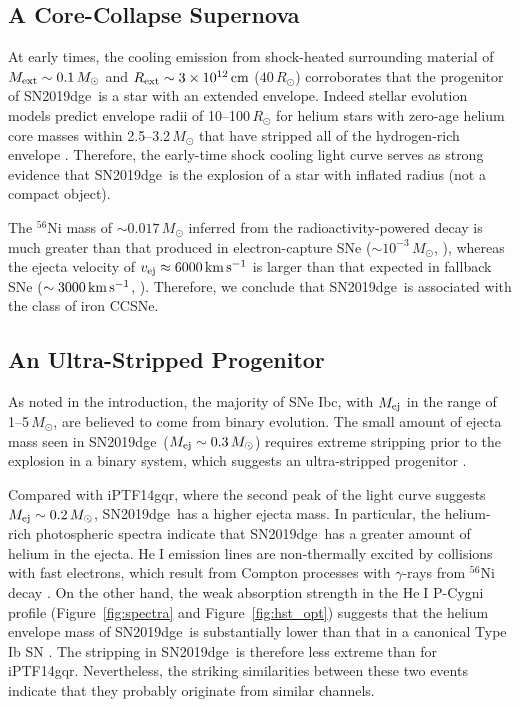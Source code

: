 \documentclass[twocolumn]{aastex63}
\newcommand{\name}{SN2019dge}
\def\ion#1#2{#1$\;${\footnotesize\rm{#2}}\relax}
\begin{document}
\begin{CJK*}{UTF8}{gbsn}
\subsection{A Core-Collapse Supernova}
At early times, the cooling emission from shock-heated surrounding material of $M_{\rm 
ext}\sim0.1\,M_\odot$ and $R_{\rm ext}\sim 3\times 10^{12}\,{\rm cm}$ ($40\,{ R_\odot}$) corroborates 
that the progenitor of \name\ is a star with an extended envelope. Indeed stellar evolution models 
predict envelope radii of 10--100\,$R_\odot$ for helium stars with zero-age helium core masses within 
2.5--3.2\,$M_\odot$ that have stripped all of the hydrogen-rich envelope \citep{Woosley2019, 
Laplace2020}. Therefore, the early-time shock cooling 
light curve serves as strong evidence that \name\ is the explosion of a star with inflated radius (not a 
compact object).

The $^{56}$Ni mass of $\sim 0.017\,M_\odot$ inferred from the radioactivity-powered decay 
is much greater than that produced in electron-capture SNe ($\sim10^{-3}\,M_\odot$, 
\citealt{Moriya2014}), whereas the ejecta velocity of $v_{\rm ej}\approx6000\,{\rm km\, s^{-1}}$ is 
larger than that expected in fallback SNe ($\sim3000\,{\rm km\,s^{-1}}$, \citealt{Moriya2010}). 
Therefore, we conclude that \name\ is associated with the class of iron CCSNe.

\subsection{An Ultra-Stripped Progenitor}
As noted in the introduction, the majority of SNe Ibc, with $M_{\rm ej}$ in the range of 
1--5\,$M_\odot$, are believed to come from binary evolution. The small amount of ejecta mass seen in 
\name\ ($M_{\rm ej}\sim 0.3\, M_\odot$) requires extreme stripping prior to the explosion in a 
binary system, which suggests an ultra-stripped progenitor \citep{Tauris2013}. 

Compared with iPTF14gqr, where the second peak of the light curve suggests $M_{\rm ej}\sim 
0.2\,M_\odot$, \name\ has a higher ejecta mass. In particular, the helium-rich photospheric 
spectra indicate that \name\ has a greater amount of helium in the ejecta. \ion{He}{I} emission lines are 
non-thermally excited by collisions with fast electrons, which result from Compton processes with 
$\gamma$-rays from $^{56}$Ni decay \citep{Dessart2012, Hachinger2012}. On the other hand, the 
weak absorption strength in the \ion{He}{I} P-Cygni profile (Figure~\ref{fig:spectra} and 
Figure~\ref{fig:hst_opt}) suggests that the helium envelope mass of \name\ is substantially lower than 
that in a canonical Type Ib SN \citep{Fremling2018}.  The stripping in \name\ is therefore less extreme 
than for iPTF14gqr. Nevertheless, the striking similarities between these two events indicate that they 
probably originate from similar channels. 


\end{CJK*}
\end{document}
